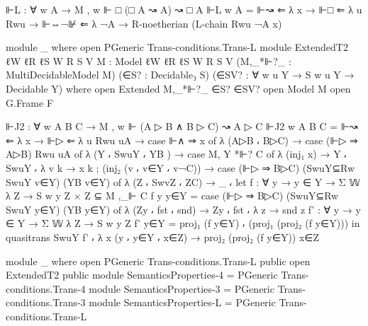 \begin{spverbatim}
    ⊩L : ∀ {w A} → M , w ⊩ □ (□ A ↝ A) ↝ □ A
    ⊩L {w} {A} = ⊩↝ ⇐ λ x → ⊩□ ⇐ λ {u} Rwu → ⊩⇔¬⊮ ⇐
      λ ¬A → R-noetherian (L-chain Rwu ¬A x)

module _ where
  open PGeneric Trans-conditions.Trans-L
  module ExtendedT2
    {ℓW ℓR ℓS}
    {W R S V}
    {M : Model {ℓW} {ℓR} {ℓS} W R S V}
    (M,_*⊩?_ : MultiDecidableModel M)
    (∈S? : Decidable₃ S)
    (∈SV? : ∀ {w u Y} → S w u Y → Decidable Y)
    where
    open Extended M,_*⊩?_ ∈S? ∈SV?
    open Model M
    open G.Frame F

    ⊩J2 : ∀ {w A B C} → M , w ⊩ (A ▷ B ∧ B ▷ C) ↝ A ▷ C
    ⊩J2 {w} {A} {B} {C} = ⊩↝ ⇐ λ x → ⊩▷ ⇐ λ {u} Rwu uA → case ⊩∧ ⇒ x of
      λ { (A▷B ⸴ B▷C) → case (⊩▷ ⇒ A▷B) Rwu uA of
      λ { (Y ⸴ SwuY ⸴ YB ) → case M, Y *⊩? C of
      λ { (inj₁ x) → Y ⸴ SwuY ⸴ λ { {v} k → x k}
      ; (inj₂ (v ⸴ v∈Y ⸴ v¬C)) → case (⊩▷ ⇒ B▷C) (SwuY⊆Rw SwuY v∈Y) (YB v∈Y) of
      λ { (Z ⸴ SwvZ ⸴ ZC) → _ ⸴ let
        f : ∀ {y} → y ∈ Y → Σ 𝕎 λ Z → S w y Z × Z ⊆ M ,_⊩ C
        f {y} y∈Y = case (⊩▷ ⇒ B▷C) (SwuY⊆Rw SwuY y∈Y) (YB y∈Y) of
          λ { (Zy ⸴ fst ⸴ snd) → Zy ⸴ fst ⸴ λ {z → snd z}}
        f' : ∀ {y} → y ∈ Y → Σ 𝕎 λ Z → S w y Z
        f' y∈Y = proj₁ (f y∈Y) ⸴ (proj₁ (proj₂ (f y∈Y))) in
        quasitrans SwuY f' ⸴ λ { {x} (y ⸴ y∈Y ⸴ x∈Z) → proj₂ (proj₂ (f y∈Y)) x∈Z}}}}}


module _ where
  open PGeneric Trans-conditions.Trans-L public
  open ExtendedT2 public
module SemanticsProperties-4 = PGeneric Trans-conditions.Trans-4
module SemanticsProperties-3 = PGeneric Trans-conditions.Trans-3
module SemanticsProperties-L = PGeneric Trans-conditions.Trans-L
\end{spverbatim}
